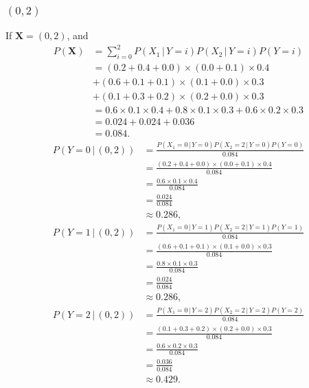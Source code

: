 \documentclass[10pt]{article}
\begin{document}
\subsubsection*{$(0, 2)$}
If $\textbf{X} = (0, 2)$, and
\begin{align*}
P(\textbf{X}) &= \sum_{i = 0}^2 P(X_1 \, | \, Y = i)P(X_2 \, | \, Y = i)P(Y = i) \\
             &= (0.2 + 0.4 + 0.0) \times (0.0 + 0.1) \times 0.4 \\
             &+ (0.6 + 0.1 + 0.1) \times (0.1 + 0.0) \times 0.3 \\
             &+ (0.1 + 0.3 + 0.2) \times (0.2 + 0.0) \times 0.3 \\
             &= 0.6 \times 0.1 \times 0.4 + 0.8 \times 0.1 \times 0.3 + 0.6 \times 0.2 \times 0.3 \\
             &= 0.024 + 0.024 + 0.036 \\
             &= 0.084.
\end{align*}
\begin{align*}
P(Y = 0 \, | \, (0, 2)) &= \frac{P(X_1= 0 \, | \, Y = 0)P(X_2 = 2 \, | \, Y = 0)P(Y = 0)}{ 0.084 } \\
     &= \frac{ (0.2 + 0.4 + 0.0) \times (0.0 + 0.1) \times 0.4 }{ 0.084 } \\
     &= \frac{ 0.6 \times 0.1 \times 0.4 }{ 0.084 } \\
     &= \frac{ 0.024 }{ 0.084 } \\
     &\approx 0.286,
\end{align*}
\begin{align*}
P(Y = 1 \, | \, (0, 2)) &= \frac{ P(X_1 = 0 \, | \, Y = 1)P(X_2 = 2\, | \,  Y = 1)P(Y = 1)}{ 0.084 } \\
     &= \frac{ (0.6 + 0.1 + 0.1) \times (0.1 + 0.0) \times 0.3 }{ 0.084 } \\
     &= \frac{ 0.8 \times 0.1 \times 0.3 }{ 0.084 } \\
     &= \frac{ 0.024 }{ 0.084 } \\
     &\approx 0.286,
\end{align*}
\begin{align*}
P(Y = 2 \, | \, (0, 2)) &= \frac{ P(X_1 = 0 \, | \, Y = 2)P(X_2 = 2 \, | \, Y = 2)P(Y = 2) }{ 0.084 } \\
     &= \frac{ (0.1 + 0.3 + 0.2) \times (0.2 + 0.0) \times 0.3 }{ 0.084 } \\
     &= \frac{ 0.6 \times 0.2 \times 0.3}{ 0.084 } \\
     &= \frac{ 0.036 }{ 0.084 } \\
     &\approx 0.429.
\end{align*}
\end{document}
